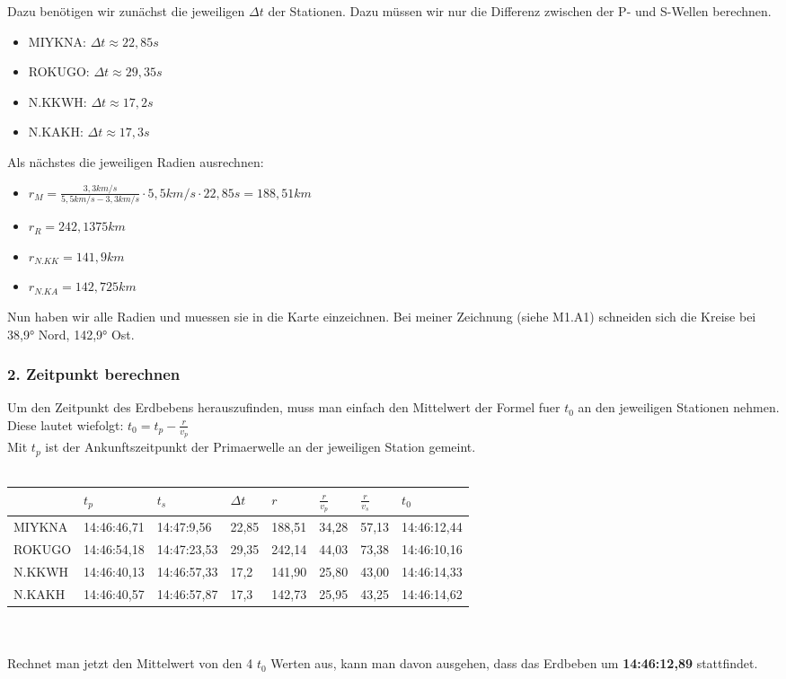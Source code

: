 \documentclass{article}
\begin{document}
Dazu benötigen wir zunächst die jeweiligen $\Delta t$ der Stationen. Dazu müssen wir nur die Differenz zwischen der P- und S-Wellen berechnen.
\begin{itemize}
	\item MIYKNA: $\Delta t \approx 22,85s$ 
	\item ROKUGO: $\Delta t \approx 29,35s$ 
	\item N.KKWH: $\Delta t \approx 17,2s$ 
	\item N.KAKH: $\Delta t \approx 17,3s$ 
\end{itemize}
\newpage
Als nächstes die jeweiligen Radien ausrechnen: 
\begin{itemize}
	\item $r_M = \frac{3,3km/s}{5,5 km/s - 3,3 km/s} \cdot 5,5 km/s \cdot 22,85 s = 188,51 km$
	\item $r_R = 242,1375km$
	\item $r_{N.KK} = 141,9km$
	\item $r_{N.KA} = 142,725km$
\end{itemize}
Nun haben wir alle Radien und muessen sie in die Karte einzeichnen. Bei meiner Zeichnung (siehe M1.A1) schneiden sich die Kreise bei 38,9° Nord, 142,9° Ost.
\subsubsection*{2. Zeitpunkt berechnen}
Um den Zeitpunkt des Erdbebens herauszufinden, muss man einfach den Mittelwert der Formel fuer $t_0$ an den jeweiligen Stationen nehmen. Diese lautet wiefolgt: $t_0 = t_p - \frac{r}{v_p}$\\Mit $t_p$ ist der Ankunftszeitpunkt der Primaerwelle an der jeweiligen Station gemeint.\\\\
\begin{tabular}{l|l|l|l|l|l|l|l}
		   & $t_{p}$         & $t_s$         & $\Delta t$ & $r$      & $\frac{r}{v_p}$    & $\frac{r}{v_s}$    & $t_0$          \\\hline
	MIYKNA & 14:46:46,71 & 14:47:9,56  & 22,85   & 188,51 & 34,28 & 57,13 & 14:46:12,44 \\
	ROKUGO & 14:46:54,18 & 14:47:23,53 & 29,35   & 242,14 & 44,03 & 73,38 & 14:46:10,16 \\
	N.KKWH & 14:46:40,13 & 14:46:57,33 & 17,2    & 141,90 & 25,80 & 43,00 & 14:46:14,33 \\
	N.KAKH & 14:46:40,57 & 14:46:57,87 & 17,3    & 142,73 & 25,95 & 43,25 & 14:46:14,62 
\end{tabular}
\\\\Rechnet man jetzt den Mittelwert von den 4 $t_0$ Werten aus, kann man davon ausgehen, dass das Erdbeben um \textbf{14:46:12,89} stattfindet.
\end{document}
